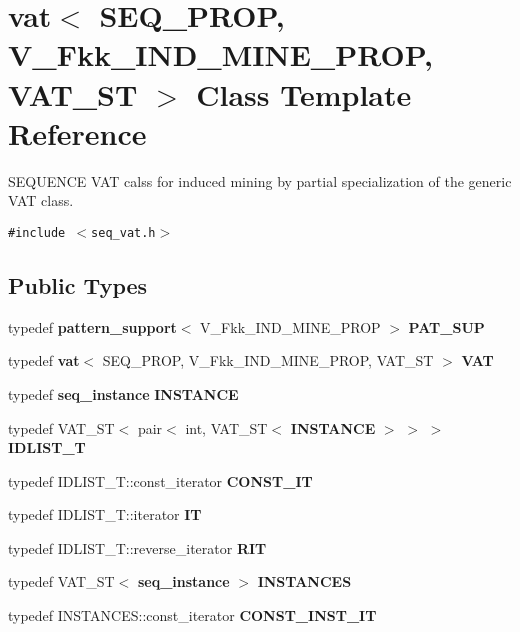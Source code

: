 \section{vat$<$ SEQ\_\-PROP, V\_\-Fkk\_\-IND\_\-MINE\_\-PROP, VAT\_\-ST $>$ Class Template Reference}
\label{classvat_3_01SEQ__PROP_00_01V__Fkk__IND__MINE__PROP_00_01VAT__ST_01_4}
SEQUENCE VAT calss for induced mining by partial specialization of the generic VAT class.  


{\tt \#include $<$seq\_\-vat.h$>$}

\subsection*{Public Types}
\begin{CompactItemize}
\item 
typedef {\bf pattern\_\-support}$<$ V\_\-Fkk\_\-IND\_\-MINE\_\-PROP $>$ {\bf PAT\_\-SUP}\label{classvat_3_01SEQ__PROP_00_01V__Fkk__IND__MINE__PROP_00_01VAT__ST_01_4_w0}

\item 
typedef {\bf vat}$<$ SEQ\_\-PROP, V\_\-Fkk\_\-IND\_\-MINE\_\-PROP, VAT\_\-ST $>$ {\bf VAT}\label{classvat_3_01SEQ__PROP_00_01V__Fkk__IND__MINE__PROP_00_01VAT__ST_01_4_w1}

\item 
typedef {\bf seq\_\-instance} {\bf INSTANCE}\label{classvat_3_01SEQ__PROP_00_01V__Fkk__IND__MINE__PROP_00_01VAT__ST_01_4_w2}

\item 
typedef VAT\_\-ST$<$ pair$<$ int, VAT\_\-ST$<$ {\bf INSTANCE} $>$ $>$ $>$ {\bf IDLIST\_\-T}\label{classvat_3_01SEQ__PROP_00_01V__Fkk__IND__MINE__PROP_00_01VAT__ST_01_4_w3}

\item 
typedef IDLIST\_\-T::const\_\-iterator {\bf CONST\_\-IT}\label{classvat_3_01SEQ__PROP_00_01V__Fkk__IND__MINE__PROP_00_01VAT__ST_01_4_w4}

\item 
typedef IDLIST\_\-T::iterator {\bf IT}\label{classvat_3_01SEQ__PROP_00_01V__Fkk__IND__MINE__PROP_00_01VAT__ST_01_4_w5}

\item 
typedef IDLIST\_\-T::reverse\_\-iterator {\bf RIT}\label{classvat_3_01SEQ__PROP_00_01V__Fkk__IND__MINE__PROP_00_01VAT__ST_01_4_w6}

\item 
typedef VAT\_\-ST$<$ {\bf seq\_\-instance} $>$ {\bf INSTANCES}\label{classvat_3_01SEQ__PROP_00_01V__Fkk__IND__MINE__PROP_00_01VAT__ST_01_4_w7}

\item 
typedef INSTANCES::const\_\-iterator {\bf CONST\_\-INST\_\-IT}
\end{CompactItemize}
